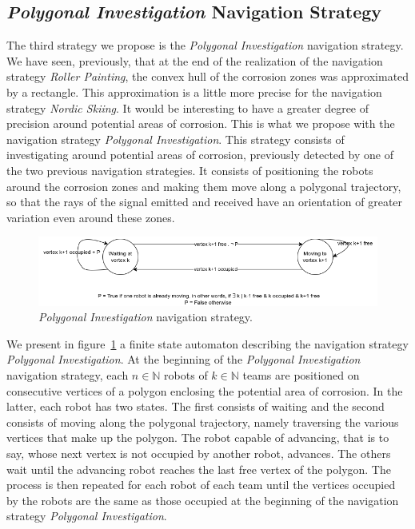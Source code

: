 \subsection{\textit{Polygonal Investigation} Navigation Strategy}

The third strategy we propose is the \textit{Polygonal Investigation} navigation strategy.
We have seen, previously, that at the end of the realization of the navigation strategy \textit{Roller Painting}, the convex hull of the corrosion zones was approximated by a rectangle.
This approximation is a little more precise for the navigation strategy \textit{Nordic Skiing}.
It would be interesting to have a greater degree of precision around potential areas of corrosion.
This is what we propose with the navigation strategy \textit{Polygonal Investigation}.
This strategy consists of investigating around potential areas of corrosion, previously detected by one of the two previous navigation strategies.
It consists of positioning the robots around the corrosion zones and making them move along a polygonal trajectory, so that the rays of the signal emitted and received have an orientation of greater variation even around these zones.

\begin{figure}[h!]
	\centering
	\includegraphics[scale=0.6]{graphics/automat_poly.png}
	\caption{\textit{Polygonal Investigation} navigation strategy.}
	\label{fig:automat}
\end{figure}

We present in figure~\ref{fig:automat} a finite state automaton describing the navigation strategy \textit{Polygonal Investigation}.
At the beginning of the \textit{Polygonal Investigation} navigation strategy, each $n \in \mathbb{N}$ robots of $k \in \mathbb{N}$ teams are positioned on consecutive vertices of a polygon enclosing the potential area of corrosion.
In the latter, each robot has two states.
The first consists of waiting and the second consists of moving along the polygonal trajectory, namely traversing the various vertices that make up the polygon.
The robot capable of advancing, that is to say, whose next vertex is not occupied by another robot, advances.
The others wait until the advancing robot reaches the last free vertex of the polygon.
The process is then repeated for each robot of each team until the vertices occupied by the robots are the same as those occupied at the beginning of the navigation strategy \textit{Polygonal Investigation}.

